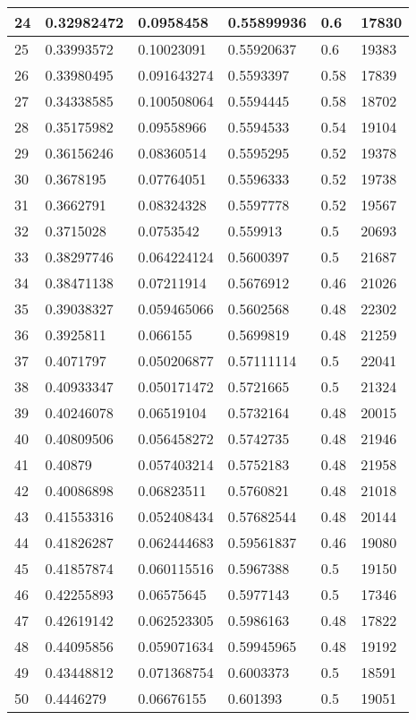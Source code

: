\begin{longtable}{|l|l|l|l|l|l|}
24 & 0.32982472 & 0.0958458 & 0.55899936 & 0.6 & 17830 \\ \hline 
25 & 0.33993572 & 0.10023091 & 0.55920637 & 0.6 & 19383 \\ \hline 
26 & 0.33980495 & 0.091643274 & 0.5593397 & 0.58 & 17839 \\ \hline 
27 & 0.34338585 & 0.100508064 & 0.5594445 & 0.58 & 18702 \\ \hline 
28 & 0.35175982 & 0.09558966 & 0.5594533 & 0.54 & 19104 \\ \hline 
29 & 0.36156246 & 0.08360514 & 0.5595295 & 0.52 & 19378 \\ \hline 
30 & 0.3678195 & 0.07764051 & 0.5596333 & 0.52 & 19738 \\ \hline 
31 & 0.3662791 & 0.08324328 & 0.5597778 & 0.52 & 19567 \\ \hline 
32 & 0.3715028 & 0.0753542 & 0.559913 & 0.5 & 20693 \\ \hline 
33 & 0.38297746 & 0.064224124 & 0.5600397 & 0.5 & 21687 \\ \hline 
34 & 0.38471138 & 0.07211914 & 0.5676912 & 0.46 & 21026 \\ \hline 
35 & 0.39038327 & 0.059465066 & 0.5602568 & 0.48 & 22302 \\ \hline 
36 & 0.3925811 & 0.066155 & 0.5699819 & 0.48 & 21259 \\ \hline 
37 & 0.4071797 & 0.050206877 & 0.57111114 & 0.5 & 22041 \\ \hline 
38 & 0.40933347 & 0.050171472 & 0.5721665 & 0.5 & 21324 \\ \hline 
39 & 0.40246078 & 0.06519104 & 0.5732164 & 0.48 & 20015 \\ \hline 
40 & 0.40809506 & 0.056458272 & 0.5742735 & 0.48 & 21946 \\ \hline 
41 & 0.40879 & 0.057403214 & 0.5752183 & 0.48 & 21958 \\ \hline 
42 & 0.40086898 & 0.06823511 & 0.5760821 & 0.48 & 21018 \\ \hline 
43 & 0.41553316 & 0.052408434 & 0.57682544 & 0.48 & 20144 \\ \hline 
44 & 0.41826287 & 0.062444683 & 0.59561837 & 0.46 & 19080 \\ \hline 
45 & 0.41857874 & 0.060115516 & 0.5967388 & 0.5 & 19150 \\ \hline 
46 & 0.42255893 & 0.06575645 & 0.5977143 & 0.5 & 17346 \\ \hline 
47 & 0.42619142 & 0.062523305 & 0.5986163 & 0.48 & 17822 \\ \hline 
48 & 0.44095856 & 0.059071634 & 0.59945965 & 0.48 & 19192 \\ \hline 
49 & 0.43448812 & 0.071368754 & 0.6003373 & 0.5 & 18591 \\ \hline 
50 & 0.4446279 & 0.06676155 & 0.601393 & 0.5 & 19051 \\ \hline 
\end{longtable}